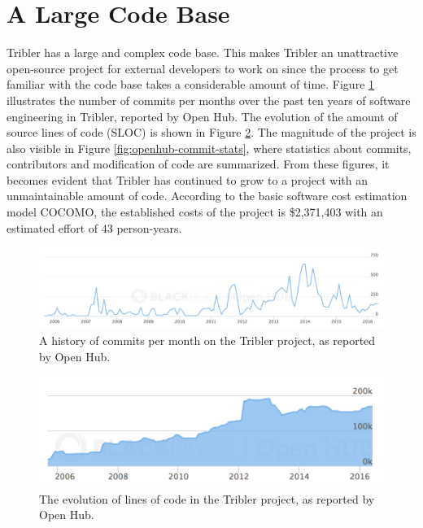 \section{A Large Code Base}
Tribler has a large and complex code base. This makes Tribler an unattractive open-source project for external developers to work on since the process to get familiar with the code base takes a considerable amount of time. Figure \ref{fig:openhub-commits} illustrates the number of commits per months over the past ten years of software engineering in Tribler, reported by Open Hub\cite{openhubtribler}. The evolution of the amount of source lines of code (SLOC) is shown in Figure \ref{fig:openhub-loc}. The magnitude of the project is also visible in Figure \ref{fig:openhub-commit-stats}, where statistics about commits, contributors and modification of code are summarized. From these figures, it becomes evident that Tribler has continued to grow to a project with an unmaintainable amount of code. According to the basic software cost estimation model COCOMO\cite{kemerer1987empirical}, the established costs of the project is \$2,371,403 with an estimated effort of 43 person-years.\\

\begin{figure}[t]
	\centering
	\includegraphics[width=\columnwidth]{images/problem_description/openhub_commits}
	\caption{A history of commits per month on the Tribler project, as reported by Open Hub.}
	\label{fig:openhub-commits}
\end{figure}

\begin{figure}[t]
	\centering
	\includegraphics[width=\columnwidth]{images/openhub_loc}
	\caption{The evolution of lines of code in the Tribler project, as reported by Open Hub.}
	\label{fig:openhub-loc}
\end{figure}

